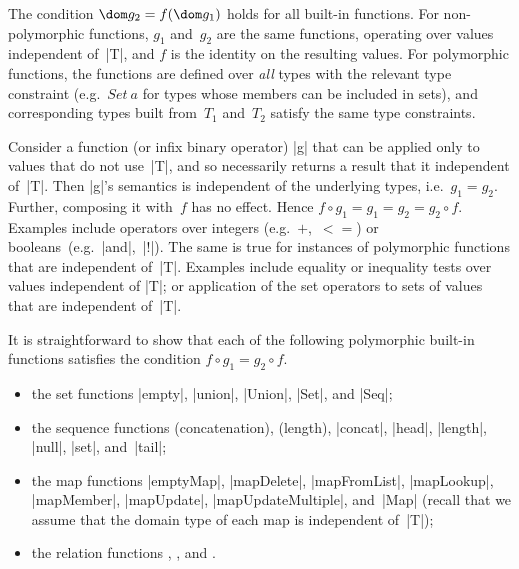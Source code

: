 The condition $\dom g_2 = f(\dom g_1)$ holds for all built-in functions.  For
non-polymorphic functions, $g_1$ and~$g_2$ are the same functions, operating
over values independent of~|T|, and $f$ is the identity on the resulting
values.  For polymorphic functions, the functions are defined over \emph{all}
types with the relevant type constraint (e.g.~$Set~a$ for types whose members
can be included in sets), and corresponding types built from~$T_1$ and~$T_2$
satisfy the same type constraints.

Consider a function (or infix binary operator) |g| that can be applied only to
values that do not use~|T|, and so necessarily returns a result that it
independent of~|T|.  Then |g|'s semantics is independent of the underlying
types, i.e.~$g_1 = g_2$.  Further, composing it with~$f$ has no effect.  Hence
$f \circ g_1 = g_1 = g_2 = g_2 \circ f$.  Examples include operators over
integers (e.g.~$+$,~$<=$) or booleans~(e.g.~|and|,~|!|).  The same is true for
instances of polymorphic functions that are independent of~|T|.  Examples
include equality or inequality tests over values independent of |T|; or
application of the set operators to sets of values that are independent
of~|T|.

It is straightforward to show that each of the following polymorphic built-in
functions satisfies the condition $f \circ g_1 = g_2 \circ f$.
%
\begin{itemize}
\item the set functions |empty|, |union|, |Union|, |Set|, and |Seq|;

\item the sequence functions \CSPM{^} (concatenation), \CSPM{#} (length),
  |concat|, |head|, |length|, |null|, |set|, and~|tail|;

\item the map functions |emptyMap|, |mapDelete|, |mapFromList|, |mapLookup|,
  |mapMember|, |mapUpdate|, |mapUpdateMultiple|, and~|Map| (recall that we
  assume that the domain type of each map is independent of~|T|);

\item the relation functions ,
  , and \-.

\end{itemize}

